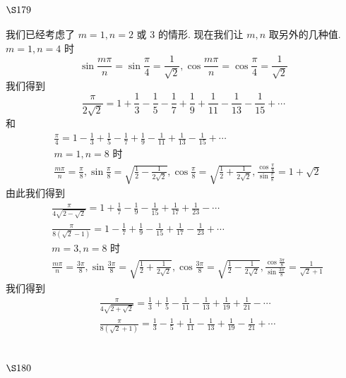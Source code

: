 \section{$\S 179$}

我们已经考虑了 $m=1, n=2$ 或 3 的情形. 现在我们让 $m, n$ 取另外的几种值. $m=1, n=4$ 时
\[
\sin \frac{m \pi}{n}=\sin \frac{\pi}{4}=\frac{1}{\sqrt{2}}, \cos \frac{m \pi}{n}=\cos \frac{\pi}{4}=\frac{1}{\sqrt{2}}
\]
我们得到
\[
\frac{\pi}{2 \sqrt{2}}=1+\frac{1}{3}-\frac{1}{5}-\frac{1}{7}+\frac{1}{9}+\frac{1}{11}-\frac{1}{13}-\frac{1}{15}+\cdots
\]
和
\[
\begin{aligned}
& \frac{\pi}{4}=1-\frac{1}{3}+\frac{1}{5}-\frac{1}{7}+\frac{1}{9}-\frac{1}{11}+\frac{1}{13}-\frac{1}{15}+\cdots \\
& m=1, n=8 \text { 时 } \\
& \frac{m \pi}{n}=\frac{\pi}{8}, \sin \frac{\pi}{8}=\sqrt{\frac{1}{2}-\frac{1}{2 \sqrt{2}}}, \cos \frac{\pi}{8}=\sqrt{\frac{1}{2}+\frac{1}{2 \sqrt{2}}}, \frac{\cos \frac{\pi}{8}}{\sin \frac{\pi}{8}}=1+\sqrt{2}
\end{aligned}
\]
由此我们得到
\[
\begin{aligned}
& \frac{\pi}{4 \sqrt{2-\sqrt{2}}}=1+\frac{1}{7}-\frac{1}{9}-\frac{1}{15}+\frac{1}{17}+\frac{1}{23}-\cdots \\
& \frac{\pi}{8(\sqrt{2}-1)}=1-\frac{1}{7}+\frac{1}{9}-\frac{1}{15}+\frac{1}{17}-\frac{1}{23}+\cdots \\
& m=3, n=8 \text { 时 } \\
& \frac{m \pi}{n}=\frac{3 \pi}{8}, \sin \frac{3 \pi}{8}=\sqrt{\frac{1}{2}+\frac{1}{2 \sqrt{2}}}, \cos \frac{3 \pi}{8}=\sqrt{\frac{1}{2}-\frac{1}{2 \sqrt{2}}}, \frac{\cos \frac{3 \pi}{8}}{\sin \frac{3 \pi}{8}}=\frac{1}{\sqrt{2}+1}
\end{aligned}
\]
我们得到
\[
\begin{aligned}
& \frac{\pi}{4 \sqrt{2+\sqrt{2}}}=\frac{1}{3}+\frac{1}{5}-\frac{1}{11}-\frac{1}{13}+\frac{1}{19}+\frac{1}{21}-\cdots \\
& \frac{\pi}{8(\sqrt{2}+1)}=\frac{1}{3}-\frac{1}{5}+\frac{1}{11}-\frac{1}{13}+\frac{1}{19}-\frac{1}{21}+\cdots
\end{aligned}
\]
\section{$\S 180$}

